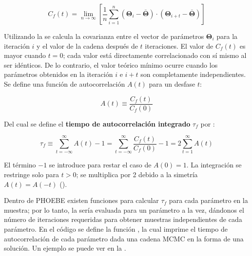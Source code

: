 \begin{eqfloat}[!ht]
	\begin{equation}
		C_f(t) = \lim_{n \rightarrow \infty} \left[\frac{1}{n} \sum_{i=1}^{n}{(\mathbf{\Theta}_i - \bar{\mathbf{\Theta}}) \cdot (\mathbf{\Theta}_{i+t} - \bar{\mathbf{\Theta}})}\right]
	\end{equation}
	\blankcaption
	\label{ecuacionAutocovarianza}
\end{eqfloat}

Utilizando la  se calcula la covarianza
entre el vector de parámetros $\mathbf{\Theta}_i$ para la iteración $i$ y el
valor de la cadena después de $t$ iteraciones. El valor de $C_f(t)$ es mayor
cuando $t = 0$; cada valor está directamente correlacionado con sí mismo al ser
idénticos. De lo contrario, el valor teórico mínimo ocurre cuando los parámetros
obtenidos en la iteración $i$ e $i+t$ son completamente independientes. Se
define una función de autocorrelación $A(t)$ para un desfase $t$:

\begin{eqfloat}[!ht]
	\begin{equation}
		A(t) \equiv \frac{C_f(t)}{C_f(0)}
	\end{equation}
\end{eqfloat}

Del cual se define el \textbf{tiempo de autocorrelación integrado} $\tau_f$
por :

\begin{eqfloat}[!ht]
	\begin{equation}
		\tau_f \equiv \sum_{t = -\infty}^{\infty} A(t) - 1 = \sum_{t = -\infty}^{\infty} \frac{C_f(t)}{C_f(0)} - 1 = 2 \sum_{t = 1}^{\infty} A(t)
	\end{equation}
	\blankcaption
	\label{ecuacionAutocorrIntegrado}
\end{eqfloat}

El término $-1$ se introduce para restar el caso de $A(0) = 1$. La integración
se restringe solo para $t > 0$; se multiplica por 2 debido a la simetría $A(t) =
A(-t)$ (). 

Dentro de PHOEBE existen funciones para calcular $\tau_f$ para cada parámetro en
la muestra; por lo tanto, la  sería evaluada
para un parámetro a la vez, dándonos el número de iteraciones requeridas para
obtener muestras independientes de cada parámetro. En el código
\href{https://github.com/KnightIV/UANL_MAPTA_Observaciones/blob/main/analisis/phoebe_model/sampling/mcmc_utils.py}{}
se define la función , la cual imprime el
tiempo de autocorrelación de cada parámetro dada una cadena MCMC en la forma de
una solución. Un ejemplo se puede ver en la
.

